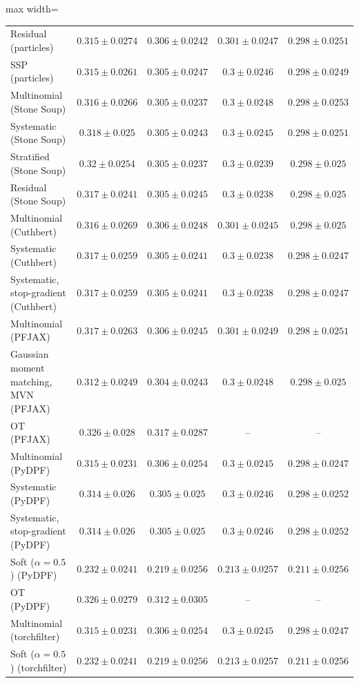 \begin{table}[H]
\begin{adjustbox}{max width=\linewidth}
\begin{tabular}{lcccc}
Residual (particles) & $0.315\pm0.0274$ & $0.306\pm0.0242$ & $0.301\pm0.0247$ & $0.298\pm0.0251$ \\
SSP (particles) & $0.315\pm0.0261$ & $0.305\pm0.0247$ & $0.3\pm0.0246$ & $0.298\pm0.0249$ \\
Multinomial (Stone Soup) & $0.316\pm0.0266$ & $0.305\pm0.0237$ & $0.3\pm0.0248$ & $0.298\pm0.0253$ \\
Systematic (Stone Soup) & $0.318\pm0.025$ & $0.305\pm0.0243$ & $0.3\pm0.0245$ & $0.298\pm0.0251$ \\
Stratified (Stone Soup) & $0.32\pm0.0254$ & $0.305\pm0.0237$ & $0.3\pm0.0239$ & $0.298\pm0.025$ \\
Residual (Stone Soup) & $0.317\pm0.0241$ & $0.305\pm0.0245$ & $0.3\pm0.0238$ & $0.298\pm0.025$ \\
Multinomial (Cuthbert) & $0.316\pm0.0269$ & $0.306\pm0.0248$ & $0.301\pm0.0245$ & $0.298\pm0.025$ \\
Systematic (Cuthbert) & $0.317\pm0.0259$ & $0.305\pm0.0241$ & $0.3\pm0.0238$ & $0.298\pm0.0247$ \\
Systematic, stop-gradient (Cuthbert) & $0.317\pm0.0259$ & $0.305\pm0.0241$ & $0.3\pm0.0238$ & $0.298\pm0.0247$ \\
Multinomial (PFJAX) & $0.317\pm0.0263$ & $0.306\pm0.0245$ & $0.301\pm0.0249$ & $0.298\pm0.0251$ \\
Gaussian moment matching, MVN (PFJAX) & $0.312\pm0.0249$ & $0.304\pm0.0243$ & $0.3\pm0.0248$ & $0.298\pm0.025$ \\
OT (PFJAX) & $0.326\pm0.028$ & $0.317\pm0.0287$ & -- & -- \\
Multinomial (PyDPF) & $0.315\pm0.0231$ & $0.306\pm0.0254$ & $0.3\pm0.0245$ & $0.298\pm0.0247$ \\
Systematic (PyDPF) & $0.314\pm0.026$ & $0.305\pm0.025$ & $0.3\pm0.0246$ & $0.298\pm0.0252$ \\
Systematic, stop-gradient (PyDPF) & $0.314\pm0.026$ & $0.305\pm0.025$ & $0.3\pm0.0246$ & $0.298\pm0.0252$ \\
Soft ($\alpha{=}0.5$) (PyDPF) & $0.232\pm0.0241$ & $0.219\pm0.0256$ & $0.213\pm0.0257$ & $0.211\pm0.0256$ \\
OT (PyDPF) & $0.326\pm0.0279$ & $0.312\pm0.0305$ & -- & -- \\
Multinomial (torchfilter) & $0.315\pm0.0231$ & $0.306\pm0.0254$ & $0.3\pm0.0245$ & $0.298\pm0.0247$ \\
Soft ($\alpha{=}0.5$) (torchfilter) & $0.232\pm0.0241$ & $0.219\pm0.0256$ & $0.213\pm0.0257$ & $0.211\pm0.0256$ \\

\end{tabular}
\end{adjustbox}
\end{table}
